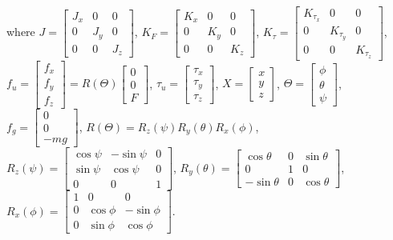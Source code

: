\documentclass[journal,12pt,onecolumn,draftclsnofoot,]{IEEEtran}
\begin{document}
where $J=\begin{bmatrix}
    J_{x} & 0 & 0 \\
    0 & J_{y} & 0 \\
    0 & 0 & J_{z}
\end{bmatrix}$, $K_F=\begin{bmatrix}
    K_{x} & 0 & 0 \\
    0 & K_{y} & 0 \\
    0 & 0 & K_{z}
\end{bmatrix}$, $K_\tau=\begin{bmatrix}
    K_{\tau_x} & 0 & 0 \\
    0 & K_{\tau_y} & 0 \\
    0 & 0 & K_{\tau_z}
\end{bmatrix}$, $f_u =\begin{bmatrix}
    f_x \\ f_y \\ f_z
\end{bmatrix} = R(\Theta)\begin{bmatrix}
    0 \\ 0 \\ F
\end{bmatrix}$, $\tau_u=\begin{bmatrix}
    \tau_x \\ \tau_y \\ \tau_z
\end{bmatrix}$, $X=\begin{bmatrix}
    x \\ y \\ z
\end{bmatrix}$, $\Theta=\begin{bmatrix}
    \phi \\ \theta \\ \psi
\end{bmatrix}$, $f_g=\begin{bmatrix}
    0 \\ 0 \\ -mg
\end{bmatrix}$, $R(\Theta)=R_z(\psi)R_y(\theta)R_x(\phi)$, $R_z(\psi)=\begin{bmatrix} %
    \cos\psi & -\sin\psi & 0 \\
    \sin\psi & \cos\psi & 0 \\
    0 & 0 & 1
\end{bmatrix}$, $R_y(\theta)=\begin{bmatrix}
    \cos\theta & 0 & \sin\theta \\
    0 & 1 & 0 \\
    -\sin\theta & 0 & \cos\theta
\end{bmatrix}$, $R_x(\phi)=\begin{bmatrix}
    1 & 0 & 0 \\
    0 & \cos\phi & -\sin\phi \\
    0 & \sin\phi & \cos\phi
\end{bmatrix}$.
\end{document}
